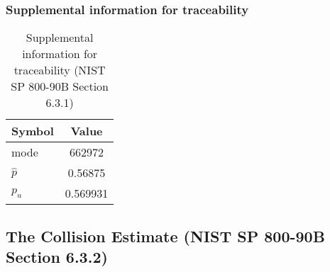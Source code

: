\documentclass[a3paper,xelatex,english]{bxjsarticle}
\begin{document}
\subsubsection{Supplemental information for traceability}
\renewcommand{\arraystretch}{1.8}
\begin{table}[h]
\caption{Supplemental information for traceability (NIST SP 800-90B Section 6.3.1)}
\begin{center}
\begin{tabular}{|l|c|}
\hline 
\rowcolor{anotherlightblue} %
Symbol				& Value \\ \hline 
mode				&   662972\\ \hline 
$\hat{p}$ 			&  0.56875\\ \hline
$p_u$				& 0.569931\\ \hline
\end{tabular}
\end{center}
\end{table}
\renewcommand{\arraystretch}{1.4}
\clearpage
\subsection{The Collision Estimate (NIST SP 800-90B Section 6.3.2)}\label{sec:Binary632}
\end{document}
